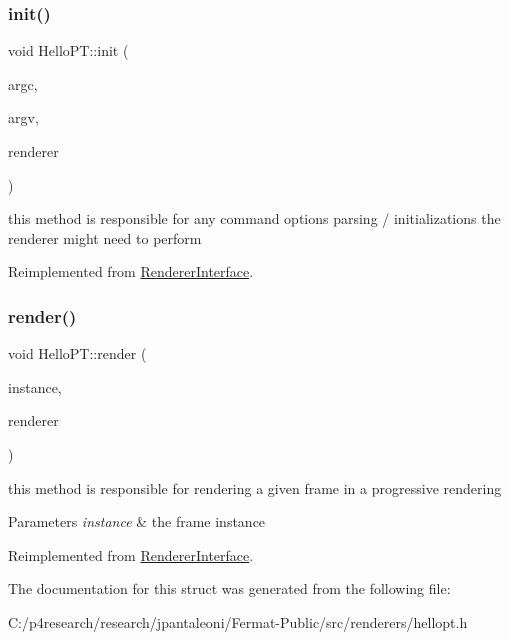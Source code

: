 \subsubsection{\texorpdfstring{init()}{init()}}
{\footnotesize\ttfamily void Hello\+P\+T\+::init (\begin{DoxyParamCaption}\item[{int}]{argc,  }\item[{char $\ast$$\ast$}]{argv,  }\item[{\hyperlink{struct_rendering_context}{Rendering\+Context} \&}]{renderer }\end{DoxyParamCaption})\hspace{0.3cm}{\ttfamily [virtual]}}

this method is responsible for any command options parsing / initializations the renderer might need to perform 

Reimplemented from \hyperlink{struct_renderer_interface_a2ead9b943d6d48fcd32872e0005ebe63}{Renderer\+Interface}.

\mbox{\label{struct_hello_p_t_af772aac0d80118742450fd8b6b3c58c2}} 
\subsubsection{\texorpdfstring{render()}{render()}}
{\footnotesize\ttfamily void Hello\+P\+T\+::render (\begin{DoxyParamCaption}\item[{const uint32}]{instance,  }\item[{\hyperlink{struct_rendering_context}{Rendering\+Context} \&}]{renderer }\end{DoxyParamCaption})\hspace{0.3cm}{\ttfamily [virtual]}}

this method is responsible for rendering a given frame in a progressive rendering


\begin{DoxyParams}{Parameters}
{\em instance} & the frame instance \\
\hline
\end{DoxyParams}


Reimplemented from \hyperlink{struct_renderer_interface_aa64254dd44c94929b05092dc8d74f29d}{Renderer\+Interface}.



The documentation for this struct was generated from the following file\+:\begin{DoxyCompactItemize}
\item 
C\+:/p4research/research/jpantaleoni/\+Fermat-\/\+Public/src/renderers/hellopt.\+h\end{DoxyCompactItemize}
